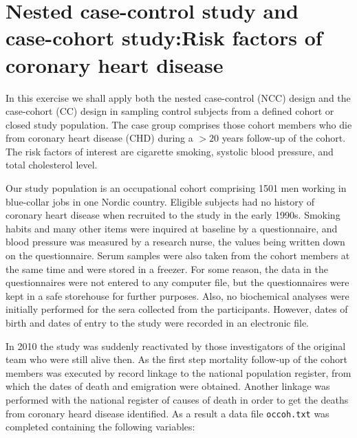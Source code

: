 



% 


\section{Nested case-control study and case-cohort study:\newline Risk factors of coronary heart disease}

In this exercise we shall apply both the nested case-control (NCC) 
design and the case-cohort (CC)  design in sampling
control subjects from a defined cohort or closed study population. 
The case group comprises those cohort members who die from coronary heart disease (CHD) during a $> 20$ years follow-up of the cohort.  
The risk factors of interest are cigarette smoking, systolic blood pressure,  and total cholesterol level.

Our study population is an occupational cohort comprising 1501 men
working in blue-collar jobs in one Nordic country. 
Eligible subjects had no history of coronary heart disease
when recruited to the study in the early 1990s. 
Smoking habits and many other items were inquired at baseline
by a questionnaire, and 
blood pressure was measured by a research nurse, the values being
 written down on the questionnaire. Serum samples were also taken from the cohort members at the same time and were stored in a freezer. For some reason,
the data in the questionnaires were not entered to any computer file, but the questionnaires were kept in a safe storehouse for further purposes. 
Also, no biochemical analyses were initially performed for the sera 
collected from the participants.  However, dates of birth and dates of entry to the study were recorded
in an electronic file.

In 2010 the study was suddenly reactivated by those investigators of the original team who were still alive then.
As the first step mortality follow-up of the cohort members was
executed by record linkage to the national population register, from which
the dates of death and emigration were obtained. Another linkage was performed with the national register of causes of death in order to get the
deaths from coronary heard disease identified. As a result a data file
{\tt occoh.txt} was completed containing the following variables:

